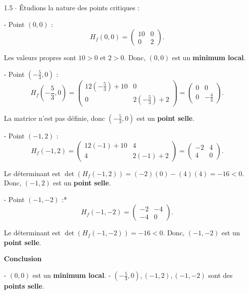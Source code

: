\documentclass[12pt]{article}
\begin{document}
\begin{spacing}{1.5}
$\cdot$ Étudions la nature des points critiques :

- Point $(0, 0)$ :
\[
   H_f(0, 0) = 
   \begin{pmatrix}
   10 & 0 \\
   0 & 2
   \end{pmatrix}.
\]

   Les valeurs propres sont $10 > 0$ et $2 > 0$. Donc, $(0, 0)$ est un \textbf{minimum local}.

- Point $\left(-\frac{5}{3}, 0\right)$ :
\[
   H_f\left(-\frac{5}{3}, 0\right) = 
   \begin{pmatrix}
   12\left(-\frac{5}{3}\right) + 10 & 0 \\
   0 & 2\left(-\frac{5}{3}\right) + 2
   \end{pmatrix} = 
   \begin{pmatrix}
   0 & 0 \\
   0 & -\frac{4}{3}
   \end{pmatrix}.
\]

   La matrice n'est pas définie, donc $\left(-\frac{5}{3}, 0\right)$ est un \textbf{point selle}.

- Point $(-1, 2)$ :
\[
   H_f(-1, 2) = 
   \begin{pmatrix}
   12(-1) + 10 & 4 \\
   4 & 2(-1) + 2
   \end{pmatrix} = 
   \begin{pmatrix}
   -2 & 4 \\
   4 & 0
   \end{pmatrix}.
\]

   Le déterminant est $\det(H_f(-1, 2)) = (-2)(0) - (4)(4) = -16 < 0$. Donc, $(-1, 2)$ est un \textbf{point selle}.

- Point $(-1, -2)$ :*
\[
   H_f(-1, -2) = 
   \begin{pmatrix}
   -2 & -4 \\
   -4 & 0
   \end{pmatrix}.
\]

   Le déterminant est $\det(H_f(-1, -2)) = -16 < 0$. Donc, $(-1, -2)$ est un \textbf{point selle}.
   
   \medskip

\textbf{ Conclusion}

- $(0, 0)$ est un \textbf{minimum local}.
- $\left(-\frac{5}{3}, 0\right), (-1, 2), (-1, -2)$ sont des \textbf{points selle}.








\end{spacing}
\end{document}
